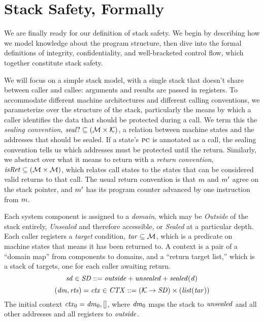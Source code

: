 \documentclass[acmsmall,review,anonymous]{acmart}\settopmatter{printfolios=true,printccs=false,printacmref=false}
\begin{document}
{\section{Stack Safety, Formally}
\label{sec:lse}

We are finally ready for our definition of stack safety. We begin
by describing how we model knowledge about the program structure,
then dive into the formal definitions of integrity, confidentiality, and
well-bracketed control flow, which together constitute stack safety.

We will focus on a simple stack model, with a single stack
that doesn't share between caller and callee: arguments and results are passed
in registers. To accommodate different machine architectures and different calling
conventions, we parameterize over the structure of the stack, particularly
the means by
which a caller identifies the data that should be protected during a call. We term
this the {\em sealing convention},
\(\mathit{seal?} \subseteq ({\mathcal M} \times {\mathcal K})\),
a relation between machine states and the addresses that should be sealed.
If a state's \(\textsc{pc}\) is annotated as a call, the sealing convention tells us
which addresses must be protected until the return. Similarly, we abstract over what
it means to return with a {\em return convention},
\(\mathit{isRet} \subseteq ({\mathcal M} \times {\mathcal M})\),
which relates call states to the states that can be considered valid returns to that call.
The usual return convention is that \(m\) and \(m'\) agree on the stack pointer,
and \(m'\) has its program counter advanced by one instruction from \(m\).

Each system component is assigned to a {\em domain}, which may be {\em Outside}
of the stack entirely, {\em Unsealed} and therefore accessible, or {\em Sealed}
at a particular depth. Each caller registers a {\em target}
condition, \(\mathit{tar} \subseteq {\mathcal M}\), which is a predicate on machine states that means it
has been returned to.
A context is a pair of a ``domain map'' from components to domains, and a
``return target list,'' which is a stack of targets, one for each caller awaiting
return.
%
\[\mathit{sd} \in \mathit{SD} ::= \mathit{outside} + \mathit{unsealed} + \mathit{sealed(d)}\]
\[(\mathit{dm},\mathit{rts}) = \mathit{ctx} \in \mathit{CTX} ::= ({\mathcal K} \rightarrow \mathit{SD})
  \times (\mathit{list} (\mathit{tar})) \]
%
The initial context \(\mathit{ctx}_0 = \mathit{dm}_0, []\), where \(\mathit{dm}_0\) maps
the stack to \(\mathit{unsealed}\) and all other addresses and all registers to \(\mathit{outside}\).

}
\end{document}
